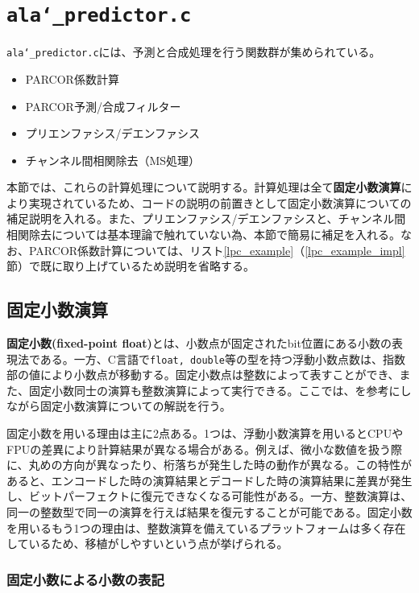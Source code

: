\documentclass[uplatex,dvipdfmx,b5j,10pt]{jsbook}
\theoremstyle{definition}
\begin{document}
\section{\texttt{ala\char`_predictor.c}}

\texttt{ala\char`_predictor.c}には、予測と合成処理を行う関数群が集められている。
\begin{itemize}
  \item PARCOR係数計算
  \item PARCOR予測/合成フィルター
  \item プリエンファシス/デエンファシス
  \item チャンネル間相関除去（MS処理）
\end{itemize}

本節では、これらの計算処理について説明する。計算処理は全て\textbf{固定小数演算}により実現されているため、コードの説明の前置きとして固定小数演算についての補足説明を入れる。また、プリエンファシス/デエンファシスと、チャンネル間相関除去については基本理論で触れていない為、本節で簡易に補足を入れる。なお、PARCOR係数計算については、リスト\ref{lpc_example}（\ref{lpc_example_impl}節）で既に取り上げているため説明を省略する。

\subsection{固定小数演算}

\textbf{固定小数(fixed-point float)}とは、小数点が固定されたbit位置にある小数の表現法である。一方、C言語で\texttt{float, double}等の型を持つ浮動小数点数は、指数部の値により小数点が移動する。固定小数点は整数によって表すことができ、また、固定小数同士の演算も整数演算によって実行できる。ここでは、\cite{fixedfloat, hdlabfixedfloat}を参考にしながら固定小数演算についての解説を行う。

固定小数を用いる理由は主に2点ある。1つは、浮動小数演算を用いるとCPUやFPUの差異により計算結果が異なる場合がある。例えば、微小な数値を扱う際に、丸めの方向が異なったり、桁落ちが発生した時の動作が異なる\cite{msfloat}。この特性があると、エンコードした時の演算結果とデコードした時の演算結果に差異が発生し、ビットパーフェクトに復元できなくなる可能性がある。一方、整数演算は、同一の整数型で同一の演算を行えば結果を復元することが可能である。固定小数を用いるもう1つの理由は、整数演算を備えているプラットフォームは多く存在しているため、移植がしやすいという点が挙げられる。

\subsubsection{固定小数による小数の表記}
\end{document}
